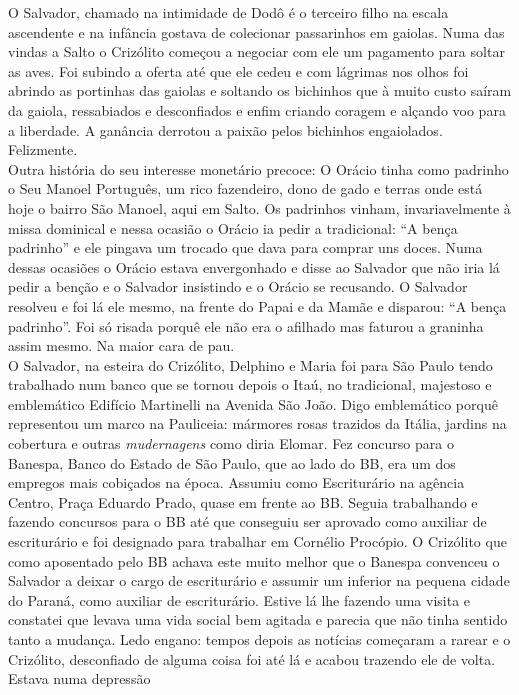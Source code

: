\documentclass[12pt,brazil,]{book}
\begin{document}
O Salvador, chamado na intimidade de Dodô é o terceiro filho na escala
ascendente e na infância gostava de colecionar passarinhos em gaiolas.
Numa das vindas a Salto o Crizólito começou a negociar com ele um
pagamento para soltar as aves. Foi subindo a oferta até que ele cedeu e
com lágrimas nos olhos foi abrindo as portinhas das gaiolas e soltando
os bichinhos que à muito custo saíram da gaiola, ressabiados e
desconfiados e enfim criando coragem e alçando voo para a liberdade. A
ganância derrotou a paixão pelos bichinhos engaiolados. Felizmente.\\
Outra história do seu interesse monetário precoce: O Orácio tinha como
padrinho o Seu Manoel Português, um rico fazendeiro, dono de gado e
terras onde está hoje o bairro São Manoel, aqui em Salto. Os padrinhos
vinham, invariavelmente à missa dominical e nessa ocasião o Orácio ia
pedir a tradicional: ``A bença padrinho'' e ele pingava um trocado que
dava para comprar uns doces. Numa dessas ocasiões o Orácio estava
envergonhado e disse ao Salvador que não iria lá pedir a benção e o
Salvador insistindo e o Orácio se recusando. O Salvador resolveu e foi
lá ele mesmo, na frente do Papai e da Mamãe e disparou: ``A bença
padrinho''. Foi só risada porquê ele não era o afilhado mas faturou a
graninha assim mesmo. Na maior cara de pau.\\
O Salvador, na esteira do Crizólito, Delphino e Maria foi para São Paulo
tendo trabalhado num banco que se tornou depois o Itaú, no tradicional,
majestoso e emblemático Edifício Martinelli na Avenida São João. Digo
emblemático porquê representou um marco na Pauliceia: mármores rosas
trazidos da Itália, jardins na cobertura e outras \emph{mudernagens}
como diria Elomar. Fez concurso para o Banespa, Banco do Estado de São
Paulo, que ao lado do BB, era um dos empregos mais cobiçados na época.
Assumiu como Escriturário na agência Centro, Praça Eduardo Prado, quase
em frente ao BB. Seguia trabalhando e fazendo concursos para o BB até
que conseguiu ser aprovado como auxiliar de escriturário e foi designado
para trabalhar em Cornélio Procópio. O Crizólito que como aposentado
pelo BB achava este muito melhor que o Banespa convenceu o Salvador a
deixar o cargo de escriturário e assumir um inferior na pequena cidade
do Paraná, como auxiliar de escriturário. Estive lá lhe fazendo uma
visita e constatei que levava uma vida social bem agitada e parecia que
não tinha sentido tanto a mudança. Ledo engano: tempos depois as
notícias começaram a rarear e o Crizólito, desconfiado de alguma coisa
foi até lá e acabou trazendo ele de volta. Estava numa depressão
\end{document}
